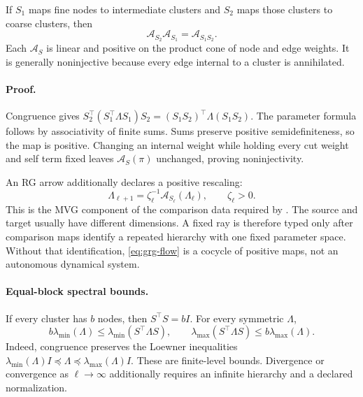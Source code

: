 If \(S_1\) maps fine nodes to intermediate clusters and \(S_2\) maps those
clusters to coarse clusters, then
\begin{equation}
\mathcal A_{S_2}\mathcal A_{S_1}
 =\mathcal A_{S_1S_2}.
\label{eq:grg-semigroup}
\end{equation}
Each \(\mathcal A_S\) is linear and positive on the product cone of node and
edge weights.  It is generally noninjective because every edge internal to a
cluster is annihilated. 

\paragraph{Proof.}
Congruence gives
\(S_2^\top(S_1^\top\Lambda S_1)S_2
=(S_1S_2)^\top\Lambda(S_1S_2)\).
The parameter formula follows by associativity of finite sums.  Sums preserve
positive semidefiniteness, so the map is positive.  Changing an internal
weight while holding every cut weight and self term fixed leaves
\(\mathcal A_S(\pi)\) unchanged, proving noninjectivity.

An RG arrow additionally declares a positive rescaling:
\begin{equation}
\Lambda_{\ell+1}
 =\zeta_\ell^{-1}\mathcal A_{S_\ell}(\Lambda_\ell),
\qquad
\zeta_\ell>0.
\label{eq:grg-flow}
\end{equation}
This is the MVG component of the comparison data required by
.  The source and target usually have different
dimensions.  A fixed ray is therefore typed only after comparison maps
identify a repeated hierarchy with one fixed parameter space.  Without that
identification, \eqref{eq:grg-flow} is a cocycle of positive maps, not an
autonomous dynamical system.

\paragraph{Equal-block spectral bounds.}
If every cluster has \(b\) nodes, then \(S^\top S=bI\).  For every symmetric
\(\Lambda\),
\begin{equation}
b\lambda_{\min}(\Lambda)
\leq\lambda_{\min}(S^\top\Lambda S),
\qquad
\lambda_{\max}(S^\top\Lambda S)
\leq b\lambda_{\max}(\Lambda).
\label{eq:grg-spectral-bounds}
\end{equation}
Indeed, congruence preserves the Loewner inequalities
\(\lambda_{\min}(\Lambda)I\preceq\Lambda
\preceq\lambda_{\max}(\Lambda)I\).
These are finite-level bounds.  Divergence or convergence as
\(\ell\to\infty\) additionally requires an infinite hierarchy and a declared
normalization. 

